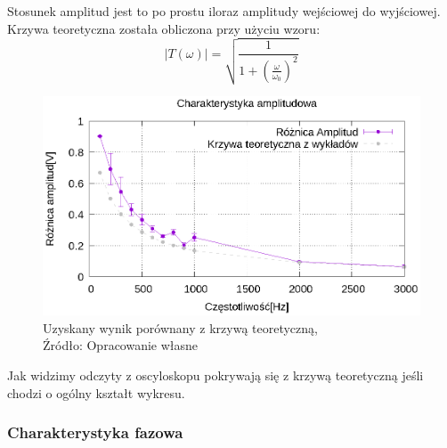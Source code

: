 \documentclass{article}
\begin{document}
        Stosunek amplitud jest to po prostu iloraz amplitudy wejściowej do wyjściowej. Krzywa teoretyczna została obliczona przy użyciu wzoru:
        \begin{equation}
          |T(\omega)| = \sqrt{\frac{1}{1+(\frac{\omega}{\omega_0})^2}}
        \end{equation}

      \begin{figure}[!ht]
        \centering
        \includegraphics[scale=0.75]{grafiki/2_amp_plot.eps}
        \caption{Uzyskany wynik porównany z krzywą teoretyczną,
            \\Źródło: Opracowanie własne}
      \end{figure}

      Jak widzimy odczyty z oscyloskopu pokrywają się z krzywą teoretyczną jeśli chodzi o ogólny kształt wykresu.
      \pagebreak

      \subsubsection{Charakterystyka fazowa}
\end{document}
